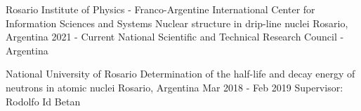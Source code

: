 

\begin{cventries}

  \cventry
    {Rosario Institute of Physics - Franco-Argentine International Center for Information Sciences and Systems} %
    {Nuclear structure in drip-line nuclei} %
    {Rosario, Argentina} %
    {2021 - Current} %
    {National Scientific and Technical Research Council - Argentina}
    
  \cventry
    {National University of Rosario} %
    {Determination of the half-life and decay energy of neutrons in atomic nuclei} %
    {Rosario, Argentina} %
    {Mar 2018 - Feb 2019} %
    {Supervisor: Rodolfo Id Betan}


\end{cventries}
